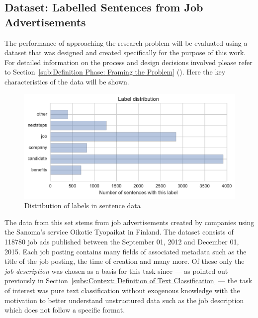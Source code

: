 \subsection{Dataset: Labelled Sentences from Job Advertisements}
\label{subs:Dataset: Labelled Sentences from Job Advertisements}

The performance of approaching the research problem will be evaluated using a dataset that was designed and created specifically for the purpose of this work. For detailed information on the process and design decisions involved please refer to Section~\ref{sub:Definition Phase: Framing the Problem} (). Here the key characteristics of the data will be shown.

\begin{figure}[h]
    \centering
    \includegraphics[width=\textwidth]{img/sentence-data-label-dist.pdf}
    \caption{Distribution of labels in sentence data}
\label{fig:sentence-data-label-dist}
\end{figure}

The data from this set stems from job advertisements created by companies using the \gls{Sanoma}'s service \gls{Oikotie Tyopaikat} in Finland. The dataset consists of 118780 job ads published between the September 01, 2012 and December 01, 2015. Each job posting contains many fields of associated metadata such as the title of the job posting, the time of creation and many more. Of these only the \emph{job description} was chosen as a basis for this task since --- as pointed out previously in Section~\ref{subs:Context: Definition of Text Classification} --- the task of interest was pure text classification without exogenous knowledge with the motivation to better understand unstructured data such as the job description which does not follow a specific format.

